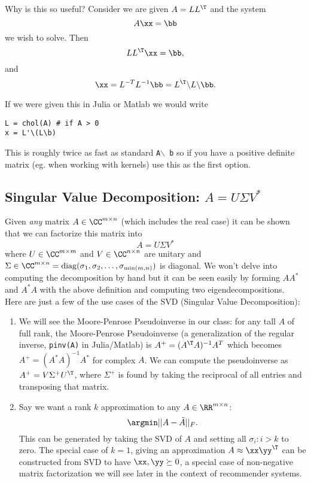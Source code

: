 \documentclass{article}
\begin{document}
Why is this so useful? Consider we are given $A=LL^\T$ and the system
\[
    A\xx = \bb
\]
we wish to solve. Then
\[
    LL^\T\xx = \bb,
\]
and
\[
    \xx = L^{-T}L^{-1}\bb = L^\T\backslash L \backslash \bb.
\]

If we were given this in Julia or Matlab we would write
{
\par
\ttfamily\small
\begin{verbatim}
L = chol(A) # if A > 0
x = L'\(L\b)
\end{verbatim}
\par
}
This is roughly twice as fast as standard \texttt{A$\backslash$ b}
so if you have a positive definite matrix (eg. when working with
kernels) use this as the first option.

\subsection{Singular Value Decomposition: $A = U\Sigma V^*$}

Given \textit{any} matrix $A\in\CC^{m\times n}$ (which includes the real
case) it can be shown that we can factorize this matrix into
\[
    A = U\Sigma V^*
\]
where $U\in\CC^{m\times m}$ and $V\in\CC^{n\times n}$ are unitary and
$\Sigma\in\CC^{m\times n} = \mathrm{diag}(\sigma_1, \sigma_2,\dots,
\sigma_{\min(m,n)})$ is diagonal. We won't delve into computing the
decomposition by hand but it can be seen easily by forming $AA^*$ and
$A^*A$ with the above definition and computing two eigendecompositions.\\

Here are just a few of the use cases of the SVD (Singular Value Decomposition):
\begin{enumerate}
\item We will see the Moore-Penrose Pseudoinverse in our class: for any
    tall $A$ of full rank, the Moore-Penrose Pseudoinverse (a generalization
    of the regular inverse, \texttt{pinv(A)} in Julia/Matlab) is
    $A^+ = (A^\T A)^{-1}A^T$ which becomes $A^+ = (A^*A)^{-1}A^*$ for complex
    $A$. We can compute the pseudoinverse as $A^+ = V\Sigma^+ U^\T$, where
    $\Sigma^+$ is found by taking the reciprocal of all entries and transposing
    that matrix.
\item Say we want a rank $k$ approximation to any $A\in\RR^{m\times n}$:
    \[
        \argmin || A - \tilde A ||_F.
    \]
    This can be generated by taking the SVD of $A$ and setting all
    $\sigma_i : i > k$ to zero. The special case of $k=1$, giving an
    approximation $A \approx \xx\yy^\T$ can be constructed from SVD
    to have $\xx,\yy \succeq 0$, a special case of non-negative matrix
    factorization we will see later in the context of recommender systems.
\end{enumerate}
\end{document}
